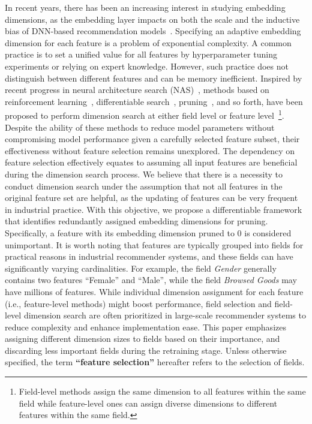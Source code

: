 \documentclass[10pt,journal,compsoc]{IEEEtran}
\begin{document}
In recent years, there has been an increasing interest in studying embedding dimensions, as the embedding layer impacts on both the scale and the inductive bias of DNN-based recommendation models~\cite{cheng2020differentiable}. Specifying an adaptive embedding dimension for each feature is a problem of exponential complexity. A common practice is to set a unified value for all features by hyperparameter tuning experiments or relying on expert knowledge. However, such practice does not distinguish between different features and can be memory inefficient.
Inspired by recent progress in neural architecture search (NAS)~\cite{liu2018darts}, methods based on reinforcement learning~\cite{joglekar2020neural}, differentiable search~\cite{zhao2020memory,zhao2020autoemb}, pruning~\cite{liu2021learnable}, and so forth, have been proposed to perform dimension search at either field level or feature level~\footnote{Field-level methods assign the same dimension to all features within the same field while feature-level ones can assign diverse dimensions to different features within the same field.}.
{Despite the ability of these methods to reduce model parameters without compromising model performance given a carefully selected feature subset, their effectiveness without feature selection remains unexplored. The dependency on feature selection effectively equates to assuming all input features are beneficial during the dimension search process.} 
{We believe that there is a necessity to conduct dimension search under the assumption that not all features in the original feature set are helpful, as the updating of features can be very frequent in industrial practice. With this objective, we propose a differentiable framework that identifies redundantly assigned embedding dimensions for pruning.}
{Specifically, a feature with its embedding dimension pruned to 0 is considered unimportant. It is worth noting that features are typically grouped into fields for practical reasons in industrial recommender systems, and these fields can have significantly varying cardinalities.}
For example, the field \textit{Gender} generally contains two features ``Female'' and ``Male'',  while the field \textit{Browsed Goods} may have millions of features.
{While individual dimension assignment for each feature (i.e., feature-level methods) might boost performance, field selection and field-level dimension search are often prioritized in large-scale recommender systems to reduce complexity and enhance implementation ease.} 
{This paper emphasizes assigning different dimension sizes to fields based on their importance, and discarding less important fields during the retraining stage. Unless otherwise specified, the term \textbf{``feature selection''} hereafter refers to the selection of fields.} 
\end{document}
